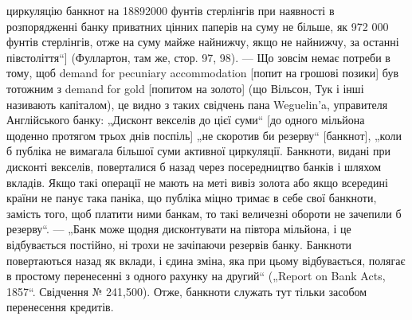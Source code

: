 циркуляцію банкнот на 18892000 фунтів стерлінгів при наявності в розпорядженні
банку приватних цінних паперів на суму не більше, як 972 000 фунтів
стерлінгів, отже на суму майже найнижчу, якщо не найнижчу, за останні
півстоліття“] (Фуллартон, там же, стор. 97, 98). — Що зовсім немає потреби
в тому, щоб demand for pecuniary accommodation [попит на грошові позики] був
тотожним з demand for gold [попитом на золото] (що Вільсон, Тук і інші називають
капіталом), це видно з таких свідчень пана Weguelin’a, управителя Англійського
банку: „Дисконт векселів до цієї суми“ [до одного мільйона щоденно
протягом трьох днів поспіль] „не скоротив би резерву“ [банкнот], „коли б публіка
не вимагала більшої суми активної циркуляції. Банкноти, видані при
дисконті векселів, поверталися б назад через посередництво банків і шляхом
вкладів. Якщо такі операції не мають на меті вивіз золота або якщо всередині
країни не панує така паніка, що публіка міцно тримає в себе свої банкноти,
замість того, щоб платити ними банкам, то такі величезні обороти не зачепили б
резерву“. — „Банк може щодня дисконтувати на півтора мільйона, і це відбувається
постійно, ні трохи не зачіпаючи резервів банку. Банкноти повертаються
назад як вклади, і єдина зміна, яка при цьому відбувається, полягає в простому
перенесенні з одного рахунку на другий“ („Report on Bank Acts, 1857“. Свідчення
№ 241,500). Отже, банкноти служать тут тільки засобом перенесення кредитів.
